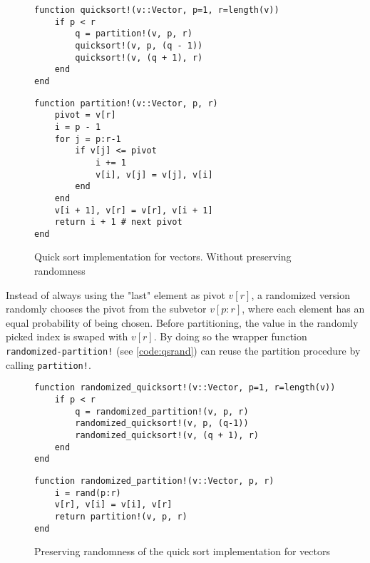 \documentclass[a4paper, 11pt]{article}
\begin{document}
    \begin{figure}[h]
        \centering
    \begin{verbatim}
function quicksort!(v::Vector, p=1, r=length(v))
    if p < r 
        q = partition!(v, p, r)    
        quicksort!(v, p, (q - 1))
        quicksort!(v, (q + 1), r)
    end
end
    \end{verbatim}
    \begin{verbatim}
function partition!(v::Vector, p, r)
    pivot = v[r]
    i = p - 1
    for j = p:r-1
        if v[j] <= pivot
            i += 1
            v[i], v[j] = v[j], v[i]
        end
    end
    v[i + 1], v[r] = v[r], v[i + 1]
    return i + 1 # next pivot
end
    \end{verbatim}
    \caption{Quick sort implementation for vectors. 
    Without preserving randomness} %
    \label{code:qsvector} %
    \end{figure}

    Instead of always using the "last" element as pivot $v[r]$, 
    a randomized version randomly chooses the pivot from the 
    subvetor $v[p:r]$, where each element has an equal probability of being
    chosen. Before partitioning, the value in the randomly picked index
    is swaped with $v[r]$. By doing so 
    the wrapper function \texttt{randomized-partition!} 
    (see \autoref{code:qsrand}) can reuse the partition procedure by calling
    \texttt{partition!}.

    \begin{figure}[h]
        \centering
    \begin{verbatim}
function randomized_quicksort!(v::Vector, p=1, r=length(v))
    if p < r
        q = randomized_partition!(v, p, r)    
        randomized_quicksort!(v, p, (q-1))
        randomized_quicksort!(v, (q + 1), r)
    end
end
    \end{verbatim}
    \begin{verbatim}
function randomized_partition!(v::Vector, p, r)
    i = rand(p:r)
    v[r], v[i] = v[i], v[r]
    return partition!(v, p, r)
end
    \end{verbatim}
    \caption{Preserving randomness of the quick sort implementation for vectors}
    \label{code:qsrand} %
    \end{figure}
\end{document}
